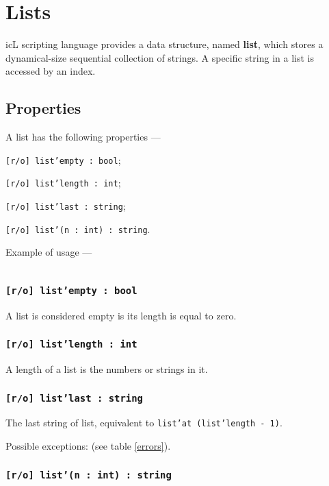 \section{Lists}

icL scripting language provides a data structure, named {\bf list}, which stores a dynamical-size sequential collection of strings. A specific string in a list is accessed by an index.

\subsection{Properties}

A list has the following properties —
\begin{icItems}
\item
	\texttt{[r/o] list'empty : bool};
\item
	\texttt{[r/o] list'length : int};
\item
	\texttt{[r/o] list'last : string};
\item
	\texttt{[r/o] list'(n : int) : string}.
\end{icItems}

Example of usage —
\inputminted[linenos]{icl}{../sources/listprop.icL}

\subsubsection{\texttt{[r/o] list'empty : bool}}

A list is considered empty is its length is equal to zero.

\subsubsection{\texttt{[r/o] list'length : int}}

A length of a list is the numbers or strings in it.

\subsubsection{\texttt{[r/o] list'last : string}}

The last string of list, equivalent to \texttt{list'at (list'length - 1)}.

Possible exceptions:  (see table \ref{errors}).

\subsubsection{\texttt{[r/o] list'(n : int) : string}}

